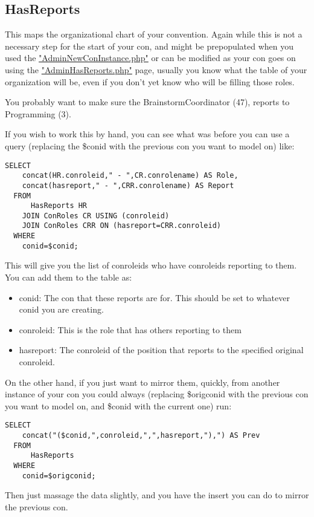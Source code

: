 \documentclass[captions=tablesignature]{scrartcl}
\begin{document}
\subsection{HasReports}
\label{sec-12-3}

This maps the organizational chart of your convention.  Again while
this is not a necessary step for the start of your con, and might
be prepopulated when you used the \href{../webpages/AdminNewConInstance.php}{"AdminNewConInstance.php"} or can
be modified as your con goes on using the \href{../webpages/AdminHasReports.php}{"AdminHasReports.php"}
page, usually you know what the table of your organization will be,
even if you don't yet know who will be filling those roles.

You probably want to make sure the BrainstormCoordinator (47),
reports to Programming (3).

If you wish to work this by hand, you can see what was before you
can use a query (replacing the \$conid with the previous con you
want to model on) like:
\begin{verbatim}
SELECT
    concat(HR.conroleid," - ",CR.conrolename) AS Role,
    concat(hasreport," - ",CRR.conrolename) AS Report
  FROM
      HasReports HR
    JOIN ConRoles CR USING (conroleid)
    JOIN ConRoles CRR ON (hasreport=CRR.conroleid)
  WHERE
    conid=$conid;
\end{verbatim}
This will give you the list of conroleids who have conroleids
reporting to them.  You can add them to the table as:
\begin{itemize}
\item conid: The con that these reports are for.  This should be set
to whatever conid you are creating.
\item conroleid: This is the role that has others reporting to them
\item hasreport: The conroleid of the position that reports to the
specified original conroleid.
\end{itemize}

On the other hand, if you just want to mirror them, quickly, from
another instance of your con you could always (replacing \$origconid
with the previous con you want to model on, and \$conid with the
current one) run:
\begin{verbatim}
SELECT
    concat("($conid,",conroleid,",",hasreport,"),") AS Prev
  FROM
      HasReports
  WHERE
    conid=$origconid;
\end{verbatim}
Then just massage the data slightly, and you have the insert you
can do to mirror the previous con.
\end{document}
